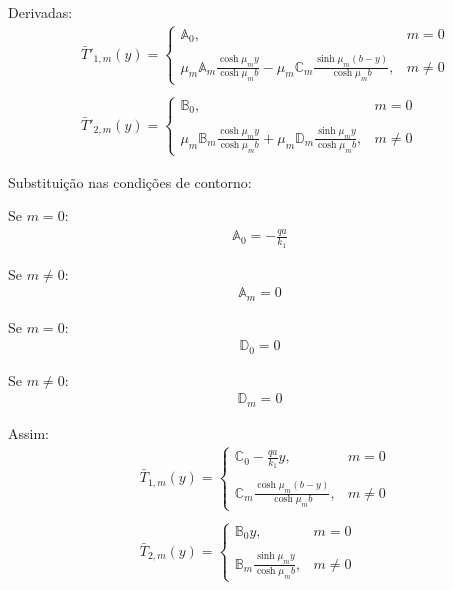 Derivadas:
\begin{align}
& \bar{T}'_{1,m}(y) = \left\lbrace
\begin{array}{ll}
\mathbb{A}_0, & m = 0 \\ \\
\displaystyle\mu_m\mathbb{A}_m\frac{\cosh\mu_m y}{\cosh\mu_m b} - \mu_m\mathbb{C}_m\frac{\sinh\mu_m (b - y)}{\cosh\mu_m b}, & m \ne 0
\end{array}
\right .
\\ \nonumber \\
& \bar{T}'_{2,m}(y) = \left\lbrace
\begin{array}{ll}
\mathbb{B}_0, & m = 0 \\ \\
\displaystyle\mu_m\mathbb{B}_m\frac{\cosh\mu_m y}{\cosh\mu_m b} + \mu_m\mathbb{D}_m\frac{\sinh\mu_m y}{\cosh\mu_m b} , & m \ne 0
\end{array}
\right .
\end{align} 


Substituição nas condições de contorno:

Se $m = 0$:
\begin{align}
\mathbb{A}_0 = -\frac{qa}{k_1}
\end{align}

Se $m \ne 0$:
\begin{align}
\mathbb{A}_m = 0
\end{align}



Se $m = 0$:
\begin{align}
\mathbb{D}_0 = 0
\end{align}

Se $m \ne 0$:
\begin{align}
\mathbb{D}_m = 0
\end{align}

Assim:
\begin{align}
& \bar{T}_{1,m}(y) = \left\lbrace
\begin{array}{ll}
\mathbb{C}_0 -\displaystyle\frac{qa}{k_1} y, & m = 0 \\ \\
\displaystyle\mathbb{C}_m\frac{\cosh\mu_m (b - y)}{\cosh\mu_m b}, & m \ne 0
\end{array}
\right .
\\ \nonumber \\
& \bar{T}_{2,m}(y) = \left\lbrace
\begin{array}{ll}
\mathbb{B}_0 y, & m = 0 \\ \\
\displaystyle\mathbb{B}_m\frac{\sinh\mu_m y}{\cosh\mu_m b}, & m \ne 0
\end{array}
\right .
\end{align} 


